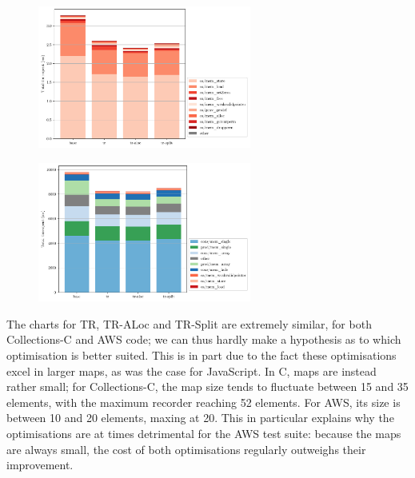 \begin{figure}
\centering
\begin{minipage}[t]{.45\textwidth}
	\centering
	\includegraphics[width=7cm]{figures/c/collectionsc_time_spent_per_action_detailed.pdf}
	\label{fig:c-timespent-collectionsc}
\end{minipage}\hfill%
\begin{minipage}[t]{.45\textwidth}
	\centering
	\includegraphics[width=7cm]{figures/c/aws_time_spent_per_action_detailed.pdf}
	\label{fig:c-timespent-aws}
\end{minipage}%
\end{figure}

The charts for TR, TR-ALoc and TR-Split are extremely similar, for both Collections-C and AWS code; we can thus hardly make a hypothesis as to which optimisation is better suited. This is in part due to the fact these optimisations excel in larger maps, as was the case for JavaScript. In C, maps are instead rather small; for Collections-C, the map size tends to fluctuate between 15 and 35 elements, with the maximum recorder reaching 52 elements. For AWS, its size is between 10 and 20 elements, maxing at 20. This in particular explains why the optimisations are at times detrimental for the AWS test suite: because the maps are always small, the cost of both optimisations regularly outweighs their improvement.

